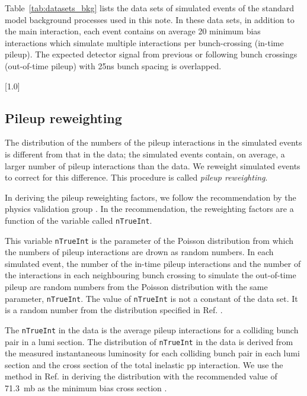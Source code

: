 Table~\ref{tab:datasets_bkg} lists the data sets of simulated events
of the standard model background processes used in this note. In these
data sets, in addition to the main interaction, each event contains on
average 20 minimum bias interactions which simulate multiple
interactions per bunch-crossing (in-time pileup). The expected
detector signal from previous or following bunch crossings
(out-of-time pileup) with 25ns bunch spacing is overlapped.

\begin{table}[!h]
 \centering
 \tiny
 \scalebox{.7}[1.0]{}
 \label{tab:datasets_bkg}
\end{table}


\clearpage

\subsection{Pileup reweighting}
\label{sec:pileup-reweighting}

The distribution of the numbers of the pileup interactions in the
simulated events is different from that in the data; the simulated
events contain, on average, a larger number of pileup interactions than
the data. We reweight simulated events to correct for this difference.
This procedure is called \textit{pileup reweighting}.

In deriving the pileup reweighting factors, we follow the
recommendation by the physics validation group
\cite{twiki-PdmVPileUpDescription, twiki-PileupJSONFileforData}. In
the recommendation, the reweighting factors are a function of the
variable called \verb!nTrueInt!.

This variable \verb!nTrueInt! is the parameter of the Poisson
distribution from which the numbers of pileup interactions are drown
as random numbers. In each simulated event, the number of the in-time
pileup interactions and the number of the interactions in each
neighbouring bunch crossing to simulate the out-of-time pileup are
random numbers from the Poisson distribution with the same parameter,
\verb!nTrueInt!. The value of \verb!nTrueInt! is not a constant of the
data set. It is a random number from the distribution specified in
Ref. \cite{github-mix_2016_25ns_SpringMC_PUScenarioV1_PoissonOOTPU_cfi}.

The \verb!nTrueInt! in the data is the average pileup interactions for
a colliding bunch pair in a lumi section. The distribution of
\verb!nTrueInt! in the data is derived from the measured instantaneous
luminosity for each colliding bunch pair in each lumi section and the
cross section of the total inelastic pp interaction. We use the method
in Ref. \cite{twiki-PileupJSONFileforData} in deriving the
distribution with the recommended value of 71.3~mb as the minimum bias
cross section \cite{CMS-FSQ-15-005}.

